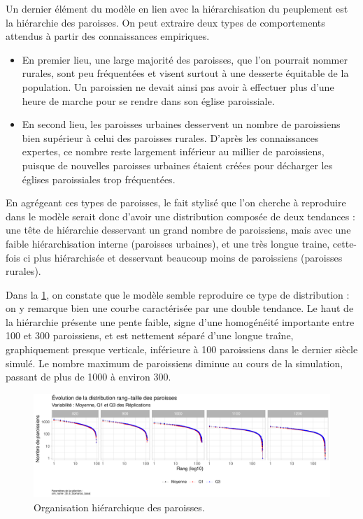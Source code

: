 Un dernier élément du modèle en lien avec la hiérarchisation du peuplement est la hiérarchie des paroisses.
On peut extraire deux types de comportements attendus à partir des connaissances empiriques.

\begin{itemize}
	\item En premier lieu, une large majorité des paroisses, que l'on pourrait nommer \og rurales\fg{}, sont peu fréquentées et visent surtout à une desserte équitable de la population.
	Un paroissien ne devait ainsi pas avoir à effectuer plus d'une heure de marche pour se rendre dans son église paroissiale.
	\item En second lieu, les paroisses \og urbaines\fg{} desservent un nombre de paroissiens bien supérieur à celui des paroisses rurales.
	D'après les connaissances expertes, ce nombre reste largement inférieur au millier de paroissiens, puisque de nouvelles paroisses urbaines étaient créées pour décharger les églises paroissiales trop fréquentées.
\end{itemize}

En agrégeant ces types de paroisses, le fait stylisé que l'on cherche à reproduire dans le modèle serait donc d'avoir une distribution composée de deux tendances : une tête de hiérarchie desservant un grand nombre de paroissiens, mais avec une faible hiérarchisation interne (paroisses urbaines), et une très longue traine, cette-fois ci plus hiérarchisée et desservant beaucoup moins de paroissiens (paroisses rurales).


Dans la \cref{fig:results-rt-paroisses}, on constate que le modèle semble reproduire ce type de distribution : on y remarque bien une courbe caractérisée par une double tendance.
Le haut de la hiérarchie présente une pente faible, signe d'une homogénéité importante entre 100 et 300 paroissiens, et est nettement séparé d'une longue traîne, graphiquement presque verticale, inférieure à 100 paroissiens dans le dernier siècle simulé.
Le nombre maximum de paroissiens diminue au cours de la simulation, passant de plus de 1000 à environ 300.

\begin{figure}[H]
	\centering
	\includegraphics[width=\linewidth]{img/results_6_6/Paroisses_RT_Haut.pdf}
	\caption{Organisation hiérarchique des paroisses.}
	\label{fig:results-rt-paroisses}
\end{figure}

